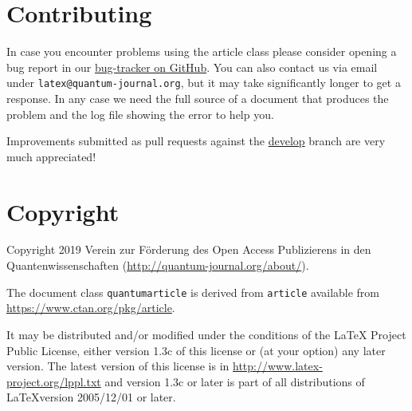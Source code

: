 \documentclass[a4paper,noarxiv,onecolumn]{quantumarticle}
\begin{document}
	\section{Contributing}
	In case you encounter problems using the article class please consider opening a bug report in our \href{https://github.com/quantum-journal/quantum-journal/issues}{bug-tracker on GitHub}. You can also contact us via email under \texttt{latex@quantum-journal.org}, but it may take significantly longer to get a response. In any case we need the full source of a document that produces the problem and the log file showing the error to help you.

	Improvements submitted as pull requests against the \href{https://github.com/quantum-journal/quantum-journal/tree/develop}{develop} branch are very much appreciated!

	\section{Copyright}
	Copyright 2019 Verein zur Förderung des Open Access Publizierens in den Quantenwissenschaften (\url{http://quantum-journal.org/about/}).

	The document class \texttt{quantumarticle} is derived from \texttt{article} available from \url{https://www.ctan.org/pkg/article}.

	It may be distributed and/or modified under the conditions of the LaTeX Project Public License, either version 1.3c of this license or (at your option) any later version. The latest version of this license is in \url{http://www.latex-project.org/lppl.txt} and version 1.3c or later is part of all distributions of \LaTeX version 2005/12/01 or later.
\end{document}
